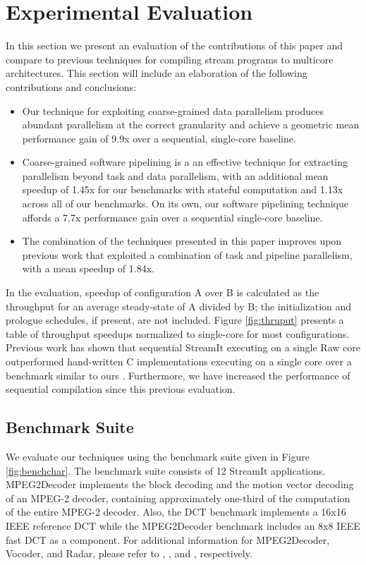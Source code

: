 \section{Experimental Evaluation}

In this section we present an evaluation of the contributions of this
paper and compare to previous techniques for compiling stream programs
to multicore architectures.  This section will include an elaboration
of the following contributions and conclusions:

\begin{itemize}
\item Our technique for exploiting coarse-grained data parallelism
produces abundant parallelism at the correct granularity and achieve a
geometric mean performance gain of 9.9x over a sequential, single-core
baseline.
\item Coarse-grained software pipelining is a
an effective technique for extracting parallelism beyond task and data
parallelism, with an additional mean speedup of 1.45x for
our benchmarks with stateful computation and 1.13x across all of our
benchmarks. On its own, our software pipelining technique affords a
7.7x performance gain over a sequential single-core baseline.
\item The combination of the techniques presented in this paper
improves upon previous work that exploited a combination of task and
pipeline parallelism, with a mean speedup of 1.84x.
\end{itemize}

In the evaluation, speedup of configuration A over B is calculated as
the throughput for an average steady-state of A divided by B; the
initialization and prologue schedules, if present, are not
included. Figure \ref{fig:thruput} presents a table of throughput
speedups normalized to single-core for most configurations.  Previous
work has shown that sequential StreamIt executing on a single Raw core
outperformed hand-written C implementations executing on a single core
over a benchmark similar to ours \cite{raw_isca}. Furthermore, we have
increased the performance of sequential compilation since this
previous evaluation.

\subsection{Benchmark Suite}
We evaluate our techniques using the benchmark suite given in Figure
\ref{fig:benchchar}.   The benchmark suite consists of 12 StreamIt
applications. MPEG2Decoder implements the block decoding and the
motion vector decoding of an MPEG-2 decoder, containing approximately
one-third of the computation of the entire MPEG-2 decoder.  Also, the
DCT benchmark implements a 16x16 IEEE reference DCT while the
MPEG2Decoder benchmark includes an 8x8 IEEE fast DCT as a component.
For additional information for MPEG2Decoder, Vocoder, and Radar,
please refer to \cite{ipdps2006},
\cite{seneff80}, and \cite{pca}, respectively. 

